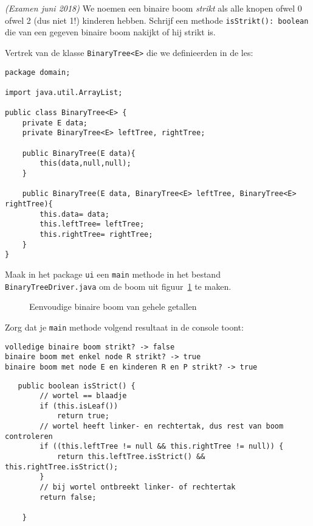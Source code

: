 \begin{oef}
\code \emph{(Examen juni 2018)} We noemen een binaire boom \emph{strikt} als alle knopen ofwel 0 ofwel 2 (dus niet 1!) kinderen hebben. Schrijf een methode \verb+isStrikt(): boolean+ die van een gegeven binaire boom nakijkt of hij strikt is. 

Vertrek van de klasse \verb+BinaryTree<E>+ die we definieerden in de les:
\begin{lstlisting}	
package domain;

import java.util.ArrayList;

public class BinaryTree<E> {
	private E data;
	private BinaryTree<E> leftTree, rightTree;
	
	public BinaryTree(E data){
		this(data,null,null);
	}
	
	public BinaryTree(E data, BinaryTree<E> leftTree, BinaryTree<E> rightTree){
		this.data= data;
		this.leftTree= leftTree;
		this.rightTree= rightTree;
	}
}
\end{lstlisting}

Maak in het package \verb+ui+ een \verb+main+ methode in het bestand \verb+BinaryTreeDriver.java+ om de boom uit figuur~\ref{fig:boom1exjuni19} te maken.
\begin{figure}[htbp]
    \centering
{}
\caption{Eenvoudige binaire boom van gehele getallen}
    \label{fig:boom1exjuni19}
\end{figure}

Zorg dat je \verb+main+ methode volgend resultaat in de console toont:
\begin{verbatim}
volledige binaire boom strikt? -> false
binaire boom met enkel node R strikt? -> true
binaire boom met node E en kinderen R en P strikt? -> true
\end{verbatim}
\begin{opl}
\begin{lstlisting}
   public boolean isStrict() {
        // wortel == blaadje
        if (this.isLeaf())
            return true;
        // wortel heeft linker- en rechtertak, dus rest van boom controleren
        if ((this.leftTree != null && this.rightTree != null)) {
            return this.leftTree.isStrict() && this.rightTree.isStrict();
        }
        // bij wortel ontbreekt linker- of rechtertak
        return false;

    }
    \end{lstlisting}
\end{opl}
\end{oef}



